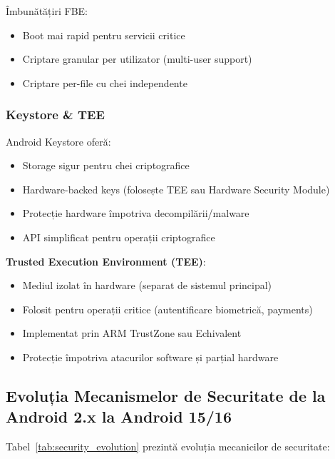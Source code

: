 \documentclass[11pt,a4paper,twocolumn]{article}
\theoremstyle{definition}
\theoremstyle{plain}
\theoremstyle{remark}
\begin{document}
Îmbunătățiri FBE:
\begin{itemize}
    \item Boot mai rapid pentru servicii critice
    \item Criptare granular per utilizator (multi-user support)
    \item Criptare per-file cu chei independente
\end{itemize}

\subsubsection{Keystore \& TEE}
Android Keystore oferă:
\begin{itemize}
    \item Storage sigur pentru chei criptografice
    \item Hardware-backed keys (folosește TEE sau Hardware Security Module)
    \item Protecție hardware împotriva decompilării/malware
    \item API simplificat pentru operații criptografice
\end{itemize}

\textbf{Trusted Execution Environment (TEE)}:
\begin{itemize}
    \item Mediul izolat în hardware (separat de sistemul principal)
    \item Folosit pentru operații critice (autentificare biometrică, payments)
    \item Implementat prin ARM TrustZone sau Echivalent
    \item Protecție împotriva atacurilor software și parțial hardware
\end{itemize}

\subsection{Evoluția Mecanismelor de Securitate de la Android 2.x la Android 15/16}

Tabel~\ref{tab:security_evolution} prezintă evoluția mecanicilor de securitate:
\end{document}
